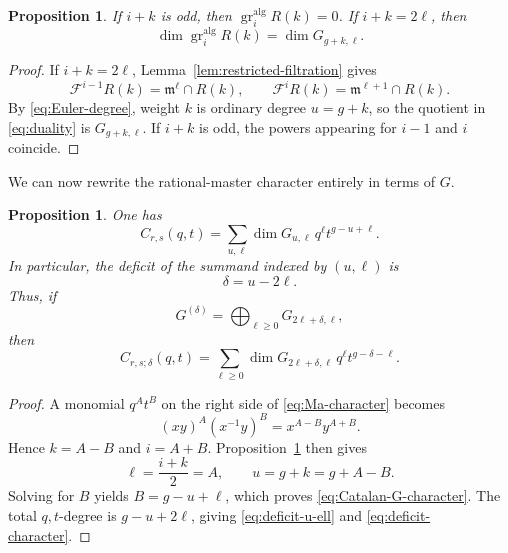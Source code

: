 \documentclass[11pt]{article}
\newtheorem{proposition}[theorem]{Proposition}
\newcommand{\gr}{\operatorname{gr}}
\newcommand{\alg}{\mathrm{alg}}
\begin{document}
\begin{proposition}\label{prop:gr-comparison}
If $i+k$ is odd, then $\gr_i^{\alg}R(k)=0$.  If
$i+k=2\ell$, then
\begin{equation}\label{eq:gr-comparison}
 \dim\gr_i^{\alg}R(k)=\dim G_{g+k,\ell}.
\end{equation}
\end{proposition}

\begin{proof}
If $i+k=2\ell$, Lemma~\ref{lem:restricted-filtration} gives
\[
 \mathcal F^{i-1}R(k)=\mathfrak m^\ell\cap R(k),
 \qquad
 \mathcal F^iR(k)=\mathfrak m^{\ell+1}\cap R(k).
\]
By \eqref{eq:Euler-degree}, weight $k$ is ordinary degree $u=g+k$,
so the quotient in \eqref{eq:duality} is $G_{g+k,\ell}$.  If $i+k$
is odd, the powers appearing for $i-1$ and $i$ coincide.
\end{proof}

We can now rewrite the rational-master character entirely in terms of
$G$.

\begin{proposition}\label{prop:Catalan-G-character}
One has
\begin{equation}\label{eq:Catalan-G-character}
 C_{r,s}(q,t)
 =\sum_{u,\ell}\dim G_{u,\ell}\,
 q^\ell t^{g-u+\ell}.
\end{equation}
In particular, the deficit of the summand indexed by $(u,\ell)$ is
\begin{equation}\label{eq:deficit-u-ell}
 \delta=u-2\ell.
\end{equation}
Thus, if
\begin{equation}\label{eq:G-delta}
 G^{(\delta)}
 =\bigoplus_{\ell\geq0}G_{2\ell+\delta,\ell},
\end{equation}
then
\begin{equation}\label{eq:deficit-character}
 C_{r,s;\delta}(q,t)
 =\sum_{\ell\geq0}
 \dim G_{2\ell+\delta,\ell}\,
 q^\ell t^{g-\delta-\ell}.
\end{equation}
\end{proposition}

\begin{proof}
A monomial $q^At^B$ on the right side of
\eqref{eq:Ma-character} becomes
\[
 (xy)^A(x^{-1}y)^B=x^{A-B}y^{A+B}.
\]
Hence $k=A-B$ and $i=A+B$.  Proposition~\ref{prop:gr-comparison}
then gives
\[
 \ell=\frac{i+k}{2}=A,
 \qquad
 u=g+k=g+A-B.
\]
Solving for $B$ yields $B=g-u+\ell$, which proves
\eqref{eq:Catalan-G-character}.  The total $q,t$-degree is
$g-u+2\ell$, giving \eqref{eq:deficit-u-ell} and
\eqref{eq:deficit-character}.
\end{proof}
\end{document}
